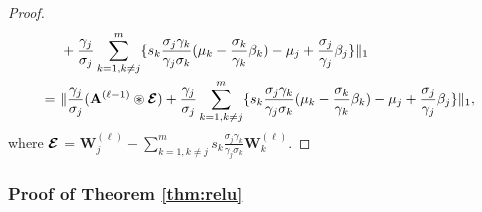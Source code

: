 \begin{proof}
\begin{eqnarray}
\begin{split}
     &~+ \frac{\gamma_{j}}{\sigma_{j}}\sum\limits_{k = 1, k \neq j}^{m} \{s_k \frac{\sigma_{j}\gamma_{k}}{\gamma_{j}\sigma_{k}}(\mu_k - \frac{\sigma_{k}}{\gamma_{k}}\beta_k) - \mu_j +\frac{\sigma_{j}}{\gamma_{j}}\beta_j \} \|_{1}\\
     =&~\|\frac{\gamma_{j}}{\sigma_{j}}(\mathbf{A}^{(\ell-1)} \circledast \boldsymbol{\mathcal{E}}) + \frac{\gamma_{j}}{\sigma_{j}}\sum\limits_{k = 1, k \neq j}^{m} \{s_k \frac{\sigma_{j}\gamma_{k}}{\gamma_{j}\sigma_{k}}(\mu_k - \frac{\sigma_{k}}{\gamma_{k}}\beta_k) - \mu_j +\frac{\sigma_{j}}{\gamma_{j}}\beta_j \} \|_{1},
     \nonumber
\end{split}
\end{eqnarray}
where $\boldsymbol{\mathcal{E}}$ = $\mathbf{W}_j^{(\ell)} - \sum\limits_{k = 1, k \neq j}^{m}s_k\frac{\sigma_{j}\gamma_{k}}{\gamma_{j}\sigma_{k}}\mathbf{W}_k^{(\ell)} $.
\end{proof}

\subsubsection{Proof of Theorem \ref{thm:relu}}

